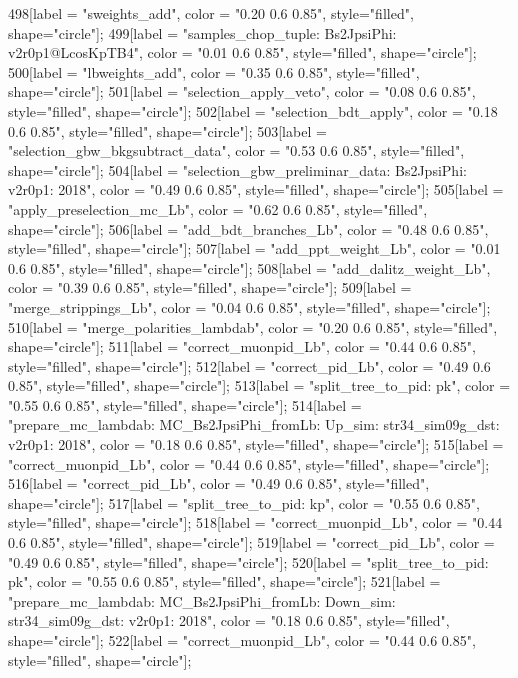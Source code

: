 {	498[label = "sweights_add", color = "0.20 0.6 0.85", style="filled", shape="circle"];
	499[label = "samples_chop_tuple\nmode: Bs2JpsiPhi\nversion: v2r0p1@LcosKpTB4", color = "0.01 0.6 0.85", style="filled", shape="circle"];
	500[label = "lbweights_add", color = "0.35 0.6 0.85", style="filled", shape="circle"];
	501[label = "selection_apply_veto", color = "0.08 0.6 0.85", style="filled", shape="circle"];
	502[label = "selection_bdt_apply", color = "0.18 0.6 0.85", style="filled", shape="circle"];
	503[label = "selection_gbw_bkgsubtract_data", color = "0.53 0.6 0.85", style="filled", shape="circle"];
	504[label = "selection_gbw_preliminar_data\nmode: Bs2JpsiPhi\nversion: v2r0p1\nyear: 2018", color = "0.49 0.6 0.85", style="filled", shape="circle"];
	505[label = "apply_preselection_mc_Lb", color = "0.62 0.6 0.85", style="filled", shape="circle"];
	506[label = "add_bdt_branches_Lb", color = "0.48 0.6 0.85", style="filled", shape="circle"];
	507[label = "add_ppt_weight_Lb", color = "0.01 0.6 0.85", style="filled", shape="circle"];
	508[label = "add_dalitz_weight_Lb", color = "0.39 0.6 0.85", style="filled", shape="circle"];
	509[label = "merge_strippings_Lb", color = "0.04 0.6 0.85", style="filled", shape="circle"];
	510[label = "merge_polarities_lambdab", color = "0.20 0.6 0.85", style="filled", shape="circle"];
	511[label = "correct_muonpid_Lb", color = "0.44 0.6 0.85", style="filled", shape="circle"];
	512[label = "correct_pid_Lb", color = "0.49 0.6 0.85", style="filled", shape="circle"];
	513[label = "split_tree_to_pid\npkkp: pk", color = "0.55 0.6 0.85", style="filled", shape="circle"];
	514[label = "prepare_mc_lambdab\nmode: MC_Bs2JpsiPhi_fromLb\npolarity: Up\nstrip_sim: str34_sim09g_dst\nversion: v2r0p1\nyear: 2018", color = "0.18 0.6 0.85", style="filled", shape="circle"];
	515[label = "correct_muonpid_Lb", color = "0.44 0.6 0.85", style="filled", shape="circle"];
	516[label = "correct_pid_Lb", color = "0.49 0.6 0.85", style="filled", shape="circle"];
	517[label = "split_tree_to_pid\npkkp: kp", color = "0.55 0.6 0.85", style="filled", shape="circle"];
	518[label = "correct_muonpid_Lb", color = "0.44 0.6 0.85", style="filled", shape="circle"];
	519[label = "correct_pid_Lb", color = "0.49 0.6 0.85", style="filled", shape="circle"];
	520[label = "split_tree_to_pid\npkkp: pk", color = "0.55 0.6 0.85", style="filled", shape="circle"];
	521[label = "prepare_mc_lambdab\nmode: MC_Bs2JpsiPhi_fromLb\npolarity: Down\nstrip_sim: str34_sim09g_dst\nversion: v2r0p1\nyear: 2018", color = "0.18 0.6 0.85", style="filled", shape="circle"];
	522[label = "correct_muonpid_Lb", color = "0.44 0.6 0.85", style="filled", shape="circle"];
}
